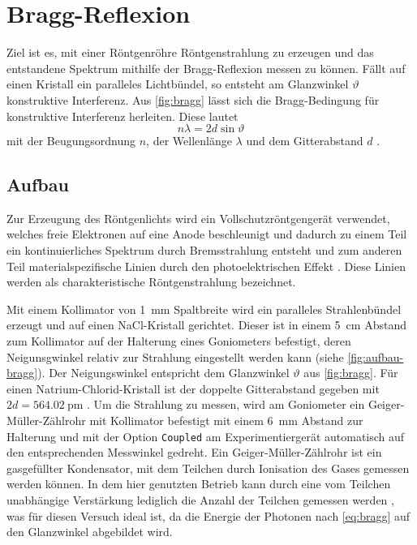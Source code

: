 \section{Bragg-Reflexion}\label{sec:bragg}
Ziel ist es, mit einer Röntgenröhre Röntgenstrahlung zu erzeugen und das entstandene
Spektrum mithilfe der Bragg-Reflexion messen zu können. Fällt auf einen Kristall ein
paralleles Lichtbündel, so entsteht am Glanzwinkel $\vartheta$ konstruktive Interferenz.
Aus \cref{fig:bragg} lässt sich die Bragg-Bedingung für konstruktive Interferenz
herleiten. Diese lautet
\begin{equation}
	n\lambda = 2d\sin\vartheta
	\label{eq:bragg}
\end{equation}
mit der Beugungsordnung $n$, der Wellenlänge $\lambda$ und dem Gitterabstand $d$ \cite{wiki:bragg}.

\subsection{Aufbau}
Zur Erzeugung des Röntgenlichts wird ein Vollschutzröntgengerät verwendet, welches
freie Elektronen auf eine Anode beschleunigt und dadurch zu einem Teil ein kontinuierliches
Spektrum durch Bremsstrahlung entsteht und zum anderen Teil materialspezifische Linien
durch den photoelektrischen Effekt \cite{wiki:roentgenroehre}. Diese Linien werden
als charakteristische Röntgenstrahlung bezeichnet.\par
Mit einem Kollimator von \SI{1}{\mm} Spaltbreite wird ein paralleles Strahlenbündel erzeugt
und auf einen NaCl-Kristall gerichtet. Dieser ist in einem \SI{5}{\cm} Abstand zum
Kollimator auf der Halterung eines Goniometers befestigt, deren Neigunsgwinkel relativ zur Strahlung
eingestellt werden kann (siehe \cref{fig:aufbau-bragg}). Der Neigungswinkel entspricht dem Glanzwinkel $\vartheta$ aus
\cref{fig:bragg}.
Für einen Natrium-Chlorid-Kristall ist der doppelte Gitterabstand gegeben mit $2d = \SI{564.02}{\pm}$ \cite{ld_bragg}.
Um die Strahlung zu messen, wird am Goniometer ein Geiger-Müller-Zählrohr mit Kollimator befestigt mit einem
\SI{6}{\mm} Abstand zur Halterung und mit der Option
\verb|Coupled| am Experimentiergerät automatisch auf den entsprechenden Messwinkel gedreht.
Ein Geiger-Müller-Zählrohr ist ein gasgefüllter Kondensator, mit dem Teilchen durch Ionisation des Gases gemessen
werden können. In dem hier genutzten Betrieb kann durch eine vom Teilchen unabhängige Verstärkung lediglich
die Anzahl der Teilchen gemessen werden \cite{wermes}, was für diesen Versuch ideal ist, da die Energie
der Photonen nach \cref{eq:bragg} auf den Glanzwinkel abgebildet wird.\par


